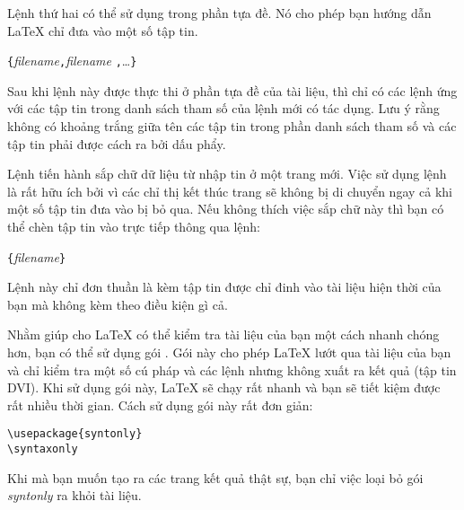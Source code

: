Lệnh thứ hai có thể sử dụng trong phần tựa đề. Nó cho phép bạn hướng dẫn \LaTeX{} chỉ đưa vào một số tập tin.
\begin{lscommand}
\verb|{|\emph{filename}\verb|,|\emph{filename}%
\verb|,|\ldots\verb|}|
\end{lscommand}

Sau khi lệnh này được thực thi ở phần tựa đề của tài liệu, thì chỉ có các lệnh  ứng với các tập tin trong danh sách tham số của lệnh  mới có tác dụng. Lưu ý rằng không có khoảng trắng giữa tên các tập tin trong phần danh sách tham số và các tập tin phải được cách ra bởi dấu phẩy.

Lệnh  tiến hành sắp chữ dữ liệu từ nhập tin ở một trang mới. Việc sử dụng lệnh  là rất hữu ích bởi vì các chỉ thị kết thúc trang sẽ không bị di chuyển ngay cả khi một số tập tin đưa vào bị bỏ qua. Nếu không thích việc sắp chữ này thì bạn có thể chèn tập tin vào trực tiếp thông qua lệnh:
\begin{lscommand}
\verb|{|\emph{filename}\verb|}|
\end{lscommand}

\noindent Lệnh này chỉ đơn thuần là kèm tập tin được chỉ đinh vào
tài liệu hiện thời của bạn mà không kèm theo điều kiện gì cả.

Nhằm giúp cho \LaTeX{} có thể kiểm tra tài liệu của bạn một cách
nhanh chóng hơn, bạn có thể sử dụng gói . Gói này
cho phép \LaTeX{} lướt qua tài liệu của bạn và chỉ kiểm tra một số
cú pháp và các lệnh nhưng không xuất ra kết quả (tập tin DVI). Khi
sử dụng gói này, \LaTeX{} sẽ chạy rất nhanh và bạn sẽ tiết kiệm
được rất nhiều thời gian. Cách sử dụng gói này rất đơn giản:
\begin{verbatim}
\usepackage{syntonly}
\syntaxonly
\end{verbatim}

Khi mà bạn muốn tạo ra các trang kết quả thật sự, bạn chỉ việc loại bỏ
gói \emph{syntonly} ra khỏi tài liệu.

%
